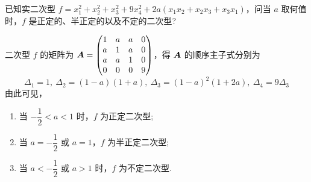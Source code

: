 \begin{example}[2005 武汉大学]
    已知实二次型 $f=x_1^2+x_2^2+x_3^2+9x_4^2+2a(x_1x_2+x_2x_3+x_3x_1)$，问当 $a$ 取何值时，$f$ 是正定的、半正定的以及不定的二次型?
\end{example}
\begin{solution}
    二次型 $f$ 的矩阵为 $\vb*{A}=\begin{pmatrix}
            1 & a & a & 0 \\
            a & 1 & a & 0 \\
            a & a & 1 & 0 \\
            0 & 0 & 0 & 9
        \end{pmatrix}$，得 $\vb*{A}$ 的顺序主子式分别为
    $$\varDelta_1=1,~\varDelta_2=(1-a)(1+a),~\varDelta_3=(1-a)^2(1+2a),~\varDelta_4=9\varDelta_3$$
    由此可见，\begin{enumerate}[label=(\arabic{*})]
        \item 当 $-\dfrac{1}{2}<a<1$ 时，$f$ 为正定二次型;
        \item 当 $a=-\dfrac{1}{2}$ 或 $a=1$，$f$ 为半正定二次型;
        \item 当 $a<-\dfrac{1}{2}$ 或 $a>1$ 时，$f$ 为不定二次型.
    \end{enumerate}
\end{solution}

